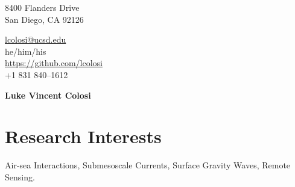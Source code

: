 \documentclass[10pt]{article}
\begin{document}
\pagestyle{empty}
\begin{minipage}[ht]{0.48\textwidth}
\begin{flushleft}
\small{8400 Flanders Drive} \\
\small{San Diego, CA 92126} \\
\end{flushleft}
\end{minipage}
\hfill
\begin{minipage}[ht]{0.48\textwidth}
\begin{flushright}
\noindent \href{mailto:lcolosi@ucsd.edu}{lcolosi@ucsd.edu} \ \ \ \ \ \ \ \ \ \ \ \ \ \ \ \ \ \ \ \   \\
\noindent he/him/his \ \ \ \ \ \ \ \ \ \ \ \ \ \ \ \ \ \ \ \ \ \ \ \ \ \ \  \\
{\url{https://github.com/lcolosi} }\\
\small{+1 831 840--1612} \ \ \ \ \ \ \ \ \ \ \ \ \ \ \ \ \  \ \ \ \ \ \ \     \\
\end{flushright}
\end{minipage}


\vspace{.5cm}
\begin{center}
	{\bfseries\Huge Luke Vincent Colosi}
\end{center}
\vspace{.5cm}

\section*{Research Interests}
\vspace{.3cm}
\hspace{1cm}Air-sea Interactions, Submesoscale Currents, Surface Gravity Waves, Remote Sensing.

\end{document}
